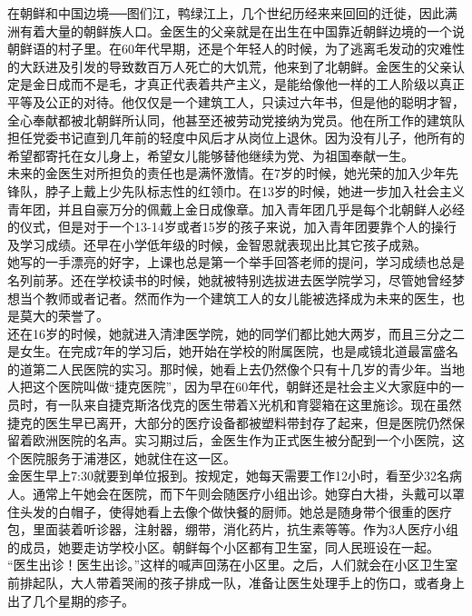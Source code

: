 在朝鲜和中国边境──图们江，鸭绿江上，几个世纪历经来来回回的迁徙，因此满洲有着大量的朝鲜族人口。金医生的父亲就是在出生在中国靠近朝鲜边境的一个说朝鲜语的村子里。在60年代早期，还是个年轻人的时候，为了逃离毛发动的灾难性的大跃进及引发的导致数百万人死亡的大饥荒，他来到了北朝鲜。金医生的父亲认定是金日成而不是毛，才真正代表着共产主义，是能给像他一样的工人阶级以真正平等及公正的对待。他仅仅是一个建筑工人，只读过六年书，但是他的聪明才智，全心奉献都被北朝鲜所认同，他甚至还被劳动党接纳为党员。他在所工作的建筑队担任党委书记直到几年前的轻度中风后才从岗位上退休。因为没有儿子，他所有的希望都寄托在女儿身上，希望女儿能够替他继续为党、为祖国奉献一生。\\

未来的金医生对所担负的责任也是满怀激情。在7岁的时候，她光荣的加入少年先锋队，脖子上戴上少先队标志性的红领巾。在13岁的时候，她进一步加入社会主义青年团，并且自豪万分的佩戴上金日成像章。加入青年团几乎是每个北朝鲜人必经的仪式，但是对于一个13-14岁或者15岁的孩子来说，加入青年团要靠个人的操行及学习成绩。还早在小学低年级的时候，金智恩就表现出比其它孩子成熟。\\

她写的一手漂亮的好字，上课也总是第一个举手回答老师的提问，学习成绩也总是名列前茅。还在学校读书的时候，她就被特别选拔进去医学院学习，尽管她曾经梦想当个教师或者记者。然而作为一个建筑工人的女儿能被选择成为未来的医生，也是莫大的荣誉了。\\

还在16岁的时候，她就进入清津医学院，她的同学们都比她大两岁，而且三分之二是女生。在完成7年的学习后，她开始在学校的附属医院，也是咸镜北道最富盛名的道第二人民医院的实习。那时候，她看上去仍然像个只有十几岁的青少年。当地人把这个医院叫做“捷克医院”，因为早在60年代，朝鲜还是社会主义大家庭中的一员时，有一队来自捷克斯洛伐克的医生带着X光机和育婴箱在这里施诊。现在虽然捷克的医生早已离开，大部分的医疗设备都被塑料带封存了起来，但是医院仍然保留着欧洲医院的名声。实习期过后，金医生作为正式医生被分配到一个小医院，这个医院服务于浦港区，她就住在这一区。\\

金医生早上7:30就要到单位报到。按规定，她每天需要工作12小时，看至少32名病人。通常上午她会在医院，而下午则会随医疗小组出诊。她穿白大褂，头戴可以罩住头发的白帽子，使得她看上去像个做快餐的厨师。她总是随身带个很重的医疗包，里面装着听诊器，注射器，绷带，消化药片，抗生素等等。作为3人医疗小组的成员，她要走访学校小区。朝鲜每个小区都有卫生室，同人民班设在一起。\\

“医生出诊！医生出诊。”这样的喊声回荡在小区里。之后，人们就会在小区卫生室前排起队，大人带着哭闹的孩子排成一队，准备让医生处理手上的伤口，或者身上出了几个星期的疹子。\\

